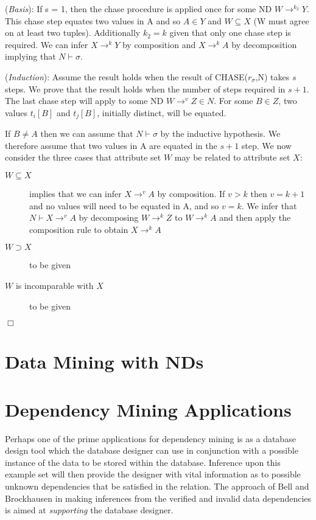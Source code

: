 \smallskip
({\em Basis}):
If s = 1, then the chase procedure is applied once for some ND $W
\to^{k_2} Y$. This chase step equates two values in A and so $A \in Y$
 and $W \subseteq X$ (W must agree
on at least two tuples). Additionally $k_2 = k$ given that only one
chase step is required. We can infer $X \to^k Y$ by composition and $X
\to^k A$ by decomposition implying that $N \vdash \sigma$.
 
\smallskip
 
({\em Induction}):
Assume the result holds when the result of CHASE($r_\sigma$,N) takes 
$s$ steps. We prove that the result holds when the number of steps
required in $s+1$. The last chase step will apply to some ND $W \to^v Z
\in N$. For some $B \in Z$, two values $t_i[B]$ and $t_j[B]$,
initially distinct, will be equated.

\smallskip
If $B \not= A$ then we can assume that $N \vdash \sigma$ by the
 inductive hypothesis. We therefore assume that two values in A are
 equated in the $s+1$ step. We now consider the three cases that
 attribute set $W$
 may be related to attribute set $X$: \\

\begin{description}
\item[$W \subseteq X$] implies that we can infer $X \to^v A$ by
 composition. If $v > k$ then $v = k+1$ and no values will need to be
 equated in A, and so $v = k$. We infer that $N \vdash X \to^v A$ by
 decomposing $W \to^k Z$ to $W \to^k A$ and then apply the composition
 rule to obtain $X \to^k A$
\item[$W \supset X$] to be given
\item[$W$ is incomparable with $X$] to be given
\end{description} 
 $\Box$



\section{Data Mining with NDs}


\section{Dependency Mining Applications}\label{sec:fd_jobs}

Perhaps one of the prime applications for dependency mining is as a database
design tool which the database designer can use in conjunction with a possible
instance of the data to be stored within the database.  Inference upon this 
example set will then provide the designer with vital information as to possible
unknown dependencies that be satisfied in the relation. The approach of 
Bell and Brockhausen \cite{bb95} in making inferences from the verified and
invalid data dependencies is aimed at {\em supporting} the database
designer. \\

